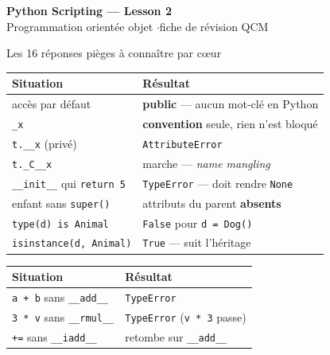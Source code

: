 \documentclass[a4paper,10pt]{article}
\newcommand{\co}[1]{\texttt{\textcolor{codefg}{#1}}}
\begin{document}

\small

\begin{center}
  {\LARGE\bfseries\color{accent} Python Scripting --- Lesson 2}\\[0.3em]
  {\normalsize Programmation orientée objet \quad$\cdot$\quad fiche de révision QCM}
\end{center}
\vspace{0.4em}

\begin{piegebox}{Les 16 réponses pièges à connaître par c\oe ur}
\begin{minipage}[t]{0.485\linewidth}
\begin{tabularx}{\linewidth}{@{}l>{\raggedright\arraybackslash}X@{}}
\toprule
\textbf{Situation} & \textbf{Résultat} \\
\midrule
accès par défaut          & \textbf{public} --- aucun mot-clé en Python \\
\co{\_x}                  & \textbf{convention} seule, rien n'est bloqué \\
\co{t.\_\_x} (privé)      & \co{AttributeError} \\
\co{t.\_C\_\_x}           & marche --- \emph{name mangling} \\
\co{\_\_init\_\_} qui \co{return 5} & \co{TypeError} --- doit rendre \co{None} \\
enfant sans \co{super()}  & attributs du parent \textbf{absents} \\
\co{type(d) is Animal}    & \co{False} pour \co{d = Dog()} \\
\co{isinstance(d, Animal)}& \co{True} --- suit l'héritage \\
\bottomrule
\end{tabularx}
\end{minipage}\hfill
\begin{minipage}[t]{0.485\linewidth}
\begin{tabularx}{\linewidth}{@{}l>{\raggedright\arraybackslash}X@{}}
\toprule
\textbf{Situation} & \textbf{Résultat} \\
\midrule
\co{a + b} sans \co{\_\_add\_\_}  & \co{TypeError} \\
\co{3 * v} sans \co{\_\_rmul\_\_} & \co{TypeError} (\co{v * 3} passe) \\
\co{+=} sans \co{\_\_iadd\_\_}    & retombe sur \co{\_\_add\_\_} \\

\end{tabularx}
\end{minipage}
\end{piegebox}
\end{document}
